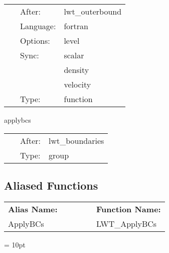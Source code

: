 \hspace{5mm}{\it select the boundary condition } 


\hspace{5mm}

 \begin{tabular*}{160mm}{cll} 
~ & After:  & lwt\_outerbound \\ 
~ & Language:  & fortran \\ 
~ & Options:  & level \\ 
~ & Sync:  & scalar \\ 
~& ~ &density\\ 
~& ~ &velocity\\ 
~ & Type:  & function \\ 
\end{tabular*} 


\vspace{5mm}


\hspace{5mm} applybcs 

\hspace{5mm}{\it apply boundary conditions } 


\hspace{5mm}

 \begin{tabular*}{160mm}{cll} 
~ & After:  & lwt\_boundaries \\ 
~ & Type:  & group \\ 
\end{tabular*} 


\subsection*{Aliased Functions}

\hspace{5mm}

 \begin{tabular*}{160mm}{ll} 

{\bf Alias Name:} ~~~~~~~ & {\bf Function Name:} \\ 
ApplyBCs & LWT\_ApplyBCs \\ 
\end{tabular*} 



\vspace{5mm}\parskip = 10pt 
